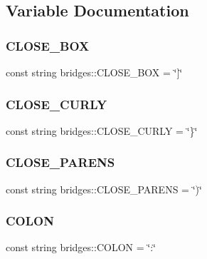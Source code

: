 \subsection{Variable Documentation}
\hypertarget{namespacebridges_a9cbd20a3f223f32670280b954061f274}{}\label{namespacebridges_a9cbd20a3f223f32670280b954061f274} 
\subsubsection{\texorpdfstring{C\+L\+O\+S\+E\+\_\+\+B\+OX}{CLOSE\_BOX}}
{\footnotesize\ttfamily const string bridges\+::\+C\+L\+O\+S\+E\+\_\+\+B\+OX = \char`\"{}\mbox{]}\char`\"{}}

\hypertarget{namespacebridges_aa0d8f65415cfe7cdca23401137d40ca9}{}\label{namespacebridges_aa0d8f65415cfe7cdca23401137d40ca9} 
\subsubsection{\texorpdfstring{C\+L\+O\+S\+E\+\_\+\+C\+U\+R\+LY}{CLOSE\_CURLY}}
{\footnotesize\ttfamily const string bridges\+::\+C\+L\+O\+S\+E\+\_\+\+C\+U\+R\+LY = \char`\"{}\}\char`\"{}}

\hypertarget{namespacebridges_aff509a0d23b28c17004b1efd5a0a5920}{}\label{namespacebridges_aff509a0d23b28c17004b1efd5a0a5920} 
\subsubsection{\texorpdfstring{C\+L\+O\+S\+E\+\_\+\+P\+A\+R\+E\+NS}{CLOSE\_PARENS}}
{\footnotesize\ttfamily const string bridges\+::\+C\+L\+O\+S\+E\+\_\+\+P\+A\+R\+E\+NS = \char`\"{})\char`\"{}}

\hypertarget{namespacebridges_a039dca813ca3a9b4c8d8a866c6fa8445}{}\label{namespacebridges_a039dca813ca3a9b4c8d8a866c6fa8445} 
\subsubsection{\texorpdfstring{C\+O\+L\+ON}{COLON}}
{\footnotesize\ttfamily const string bridges\+::\+C\+O\+L\+ON = \char`\"{}\+:\char`\"{}}

